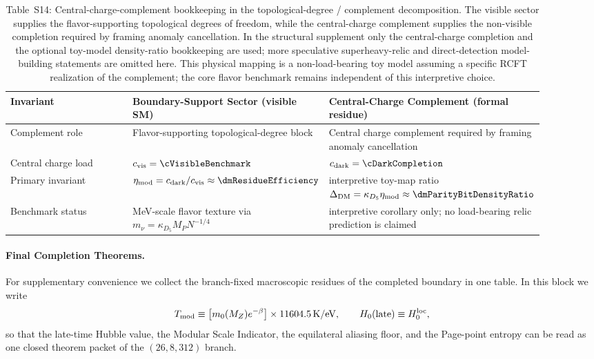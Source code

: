 \documentclass[11pt]{article}
\begin{document}
\begin{table}[t]
\centering
\small
\begin{tabular}{>{\raggedright\arraybackslash}p{0.28\linewidth}>{\raggedright\arraybackslash}p{0.31\linewidth}>{\raggedright\arraybackslash}p{0.31\linewidth}}
\hline
Invariant & Boundary-Support Sector (visible SM) & Central-Charge Complement (formal residue) \\
\hline
Complement role & Flavor-supporting topological-degree block & Central charge complement required by framing anomaly cancellation \\

Central charge load & $c_{\rm vis}=\cVisibleBenchmark$ & $c_{\rm dark}=\cDarkCompletion$ \\

Primary invariant & $\eta_{\rm mod}=c_{\rm dark}/c_{\rm vis}\approx\dmResidueEfficiency$ & interpretive toy-map ratio $\Delta_{\rm DM}=\kappa_{D_5}\eta_{\rm mod}\approx\dmParityBitDensityRatio$ \\

Benchmark status & MeV-scale flavor texture via $m_\nu=\kappa_{D_5}M_PN^{-1/4}$ & interpretive corollary only; no load-bearing relic prediction is claimed \\
\hline
\end{tabular}
\caption{Table~S14: Central-charge-complement bookkeeping in the topological-degree / complement decomposition. The visible sector supplies the flavor-supporting topological degrees of freedom, while the central-charge complement supplies the non-visible completion required by framing anomaly cancellation. In the structural supplement only the central-charge completion and the optional toy-model density-ratio bookkeeping are used; more speculative superheavy-relic and direct-detection model-building statements are omitted here. This physical mapping is a non-load-bearing toy model assuming a specific RCFT realization of the complement; the core flavor benchmark remains independent of this interpretive choice.}
\label{tab:s14-dark-sector-invariants}
\end{table}

\paragraph{Final Completion Theorems.}
For supplementary convenience we collect the branch-fixed macroscopic residues of
the completed boundary in one table. In this block we write
\begin{equation}
 T_{\rm mod}\equiv \bigl[m_0(M_Z)e^{-\beta}\bigr]\times 11604.5\,\mathrm{K/eV},
 \qquad
 H_0(\text{late})\equiv H_0^{\rm loc},
\end{equation}
so that the late-time Hubble value, the Modular Scale Indicator, the equilateral
aliasing floor, and the Page-point entropy can be read as one closed theorem
packet of the $(26,8,312)$ branch.
\end{document}
